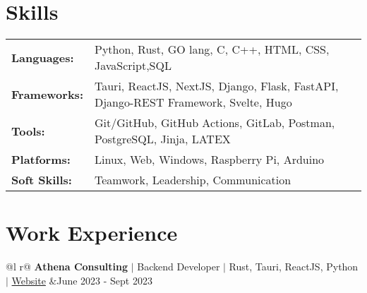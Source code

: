 \documentclass[legalpaper,11pt]{article}
\begin{document}
\section{Skills}
\begin{tabularx}{\linewidth}{@{}l X@{}}
\textbf{Languages:} &  \normalsize{Python, Rust, GO lang, C, C++, HTML, CSS, JavaScript,SQL}\\
\textbf{Frameworks:}  &  \normalsize{Tauri, ReactJS, NextJS, Django, Flask, FastAPI, Django-REST Framework, Svelte, Hugo}\\  
\textbf{Tools:} &  \normalsize{Git/GitHub, GitHub Actions, GitLab, Postman, PostgreSQL, Jinja, LATEX} \\
\textbf{Platforms:} &  \normalsize{Linux, Web, Windows, Raspberry Pi, Arduino}\\
\textbf{Soft Skills:} &  \normalsize{Teamwork, Leadership, Communication}\\
\end{tabularx}

\section{Work Experience}

\begin{tabularx}{\linewidth}{ @{}l r@{} }
\textbf {Athena Consulting} $|$ Backend Developer $|$ Rust, Tauri, ReactJS, Python $|$ \href{https://www.athenaconsulting.io/}{Website} &\hfill June 2023 - Sept 2023 \\[3.75pt]
  \\
\end{tabularx}

\end{document}
